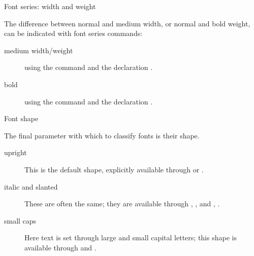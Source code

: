  {Font series: width and weight}

The difference between normal and medium width, or normal and bold
weight, can be indicated with font series commands:
\begin{description}
\item[medium width/weight] using the command  and the
  declaration .
\item[bold]  using the command  and the declaration
  .
\end{description}

 {Font shape}

The final parameter with which to classify fonts is their shape.
\begin{description}
\item[upright] This is the default shape, explicitly available through
   or .
\item[italic and slanted] These are often the same; they are available
  through , , and ,
  .
\item[small caps] Here text is set through large and small capital
  letters; this shape is available through  and
  .
\end{description}

